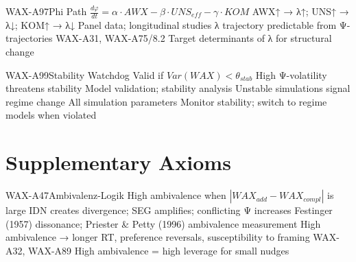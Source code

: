 \begin{axiomspec}{WAX-A97}{Phi Path}
 $\frac{d\varphi}{dt} = \alpha \cdot AWX - \beta \cdot UNS_{eff} - \gamma \cdot KOM$
 AWX↑ → λ↑; UNS↑ → λ↓; KOM↑ → λ↓
 Panel data; longitudinal studies
 λ trajectory predictable from Ψ-trajectories
 WAX-A31, WAX-A75/8.2
 Target determinants of λ for structural change
\end{axiomspec}

\begin{axiomspec}{WAX-A99}{Stability Watchdog}
 Valid if $Var(WAX) < \theta_{stab}$
 High Ψ-volatility threatens stability
 Model validation; stability analysis
 Unstable simulations signal regime change
 All simulation parameters
 Monitor stability; switch to regime models when violated
\end{axiomspec}



\section{Supplementary Axioms}
\label{sec:av-supplementary}




\begin{axiomspec}{WAX-A47}{Ambivalenz-Logik}
 High ambivalence when $|WAX_{add} - WAX_{compl}|$ is large
 IDN creates divergence; SEG amplifies; conflicting Ψ increases
 Festinger (1957) dissonance; Priester \& Petty (1996) ambivalence measurement
 High ambivalence → longer RT, preference reversals, susceptibility to framing
 WAX-A32, WAX-A89
 High ambivalence = high leverage for small nudges
\end{axiomspec}


